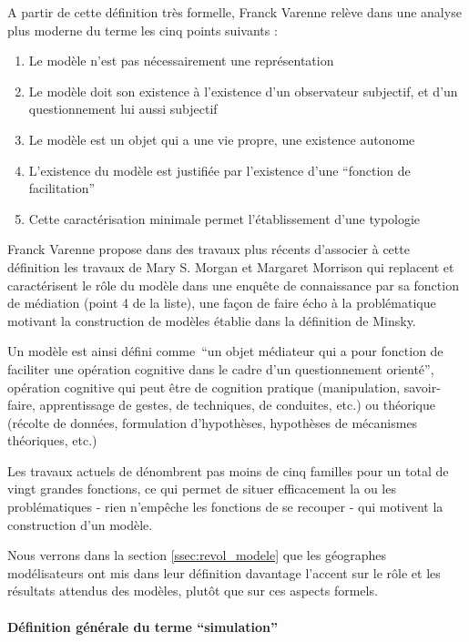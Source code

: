 A partir de cette définition très formelle, Franck Varenne \autocite{Varenne2008} relève dans une analyse plus moderne du terme les cinq points suivants : 
\begin{enumerate}
  \item Le modèle n'est pas nécessairement une représentation
  \item Le modèle doit son existence à l'existence d'un observateur subjectif, et d'un questionnement lui aussi subjectif
  \item Le modèle est un objet qui a une vie propre, une existence autonome
  \item L'existence du modèle est justifiée par l'existence d'une \enquote{fonction de facilitation}
  \item Cette caractérisation minimale permet l'établissement d'une typologie
\end{enumerate}

Franck Varenne propose dans des travaux plus récents \autocite{Varenne2013} d'associer à cette définition les travaux de Mary S. Morgan et Margaret Morrison qui replacent et caractérisent le rôle du modèle dans une enquête de connaissance par sa fonction de médiation (point 4 de la liste), une façon de faire écho à la problématique motivant la construction de modèles établie dans la définition de Minsky.

Un modèle est ainsi défini comme \enquote{un objet médiateur qui a pour fonction de faciliter une opération cognitive dans le cadre d'un questionnement orienté}, opération cognitive qui peut être de cognition pratique (manipulation, savoir-faire, apprentissage de gestes, de techniques, de conduites, etc.) ou théorique (récolte de données, formulation d'hypothèses, hypothèses de mécanismes théoriques, etc.) \autocite{Varenne2013}

Les travaux actuels de \textcite{Varenne2008, Varenne2013} dénombrent pas moins de cinq familles pour un total de vingt grandes fonctions, ce qui permet de situer efficacement la ou les problématiques - rien n’empêche les fonctions de se recouper - qui motivent la construction d'un modèle. 

Nous verrons dans la section \ref{ssec:revol_modele} que les géographes modélisateurs ont mis dans leur définition davantage l'accent sur le rôle et les résultats attendus des modèles, plutôt que sur ces aspects formels.

\paragraph{Définition générale du terme \enquote{simulation}}

